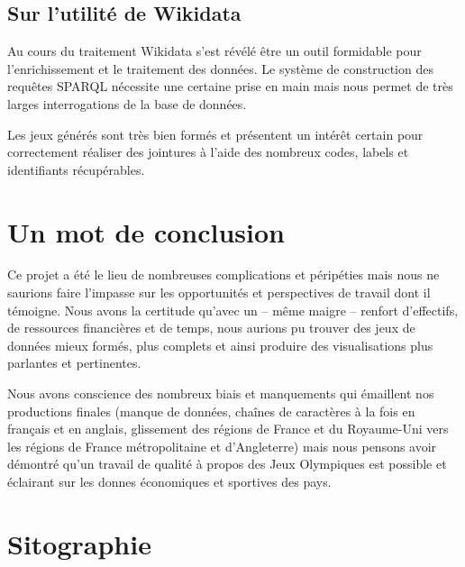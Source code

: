 \documentclass[hidelinks, 12pt]{report}
\begin{document}
\section{Sur l'utilité de Wikidata}

Au cours du traitement Wikidata s'est révélé être un outil formidable pour l'enrichissement et le traitement des données. Le système de construction des requêtes SPARQL nécessite une certaine prise en main mais nous permet de très larges interrogations de la base de données.

Les jeux générés sont très bien formés et présentent un intérêt certain pour correctement réaliser des jointures à l'aide des nombreux codes, labels et identifiants récupérables.
\newpage





%





\chapter{Un mot de conclusion}

Ce projet a été le lieu de nombreuses complications et péripéties mais nous ne saurions faire l'impasse sur les opportunités et perspectives de travail dont il témoigne. Nous avons la certitude qu'avec un -- même maigre -- renfort d'effectifs, de ressources financières et de temps, nous aurions pu trouver des jeux de données mieux formés, plus complets et ainsi produire des visualisations plus parlantes et pertinentes.

Nous avons conscience des nombreux biais et manquements qui émaillent nos productions finales (manque de données, chaînes de caractères à la fois en français et en anglais, glissement des régions de France et du Royaume-Uni vers les régions de France métropolitaine et d'Angleterre) mais nous pensons avoir démontré qu'un travail de qualité à propos des Jeux Olympiques est possible et éclairant sur les donnes économiques et sportives des pays.





%





\chapter{Sitographie}
\printbibliography[heading=none]
\newpage

\end{document}
